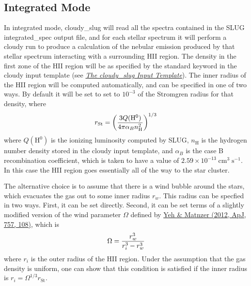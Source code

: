 \documentclass[letterpaper,10pt,english]{sphinxmanual}
\begin{document}
\subsection{Integrated Mode}
\label{cloudy:sssec-cloudy-integrated-mode}\label{cloudy:integrated-mode}
In integrated mode, cloudy\_slug will read all the spectra contained in
the SLUG integrated\_spec output file, and for each stellar spectrum it
will perform a cloudy run to produce a calculation of the nebular
emission produced by that stellar spectrum interacting with a
surrounding HII region. The density in the first zone of the HII
region will be as specified by the standard  keyword in the
cloudy input template (see {\hyperref[cloudy:ssec\string-cloudy\string-template]{\emph{The cloudy\_slug Input Template}}}). The inner
radius of the HII region will be computed automatically, and can be
specified in one of two ways. By default it will be set to
set to \(10^{-3}\) of the Stromgren radius for that density, where
\begin{gather}
\begin{split}r_{\mathrm{St}} = \left(\frac{3 Q(\mathrm{H}^0)}{4\pi
\alpha_B n_{\mathrm{H}}^2}\right)^{1/3}\end{split}\notag
\end{gather}
where \(Q(\mathrm{H}^0)\) is the ionizing luminosity computed by
SLUG, \(n_{\mathrm{H}}\) is the hydrogen number density stored in
the cloudy input template, and \(\alpha_B\) is the case B
recombination coefficient, which is taken to have a value of
\(2.59\times 10^{-13}\;\mathrm{cm}^3\;\mathrm{s}^{-1}\). In this
case the HII region goes essentially all of the way to the star
cluster.

The alternative choice is to assume that there is a wind bubble around
the stars, which evacuates the gas out to some inner radius
\(r_w\). This radius can be specfied in two ways. First, it can be set
directly. Second, it can be set terms of a slightly modified version
of the wind parameter \(\Omega\) defined by \href{http://adsabs.harvard.edu/abs/2012ApJ...757..108Y}{Yeh \& Matnzer (2012,
ApJ, 757, 108)}, which is
\begin{gather}
\begin{split}\Omega = \frac{r_w^3}{r_i^3 - r_w^3}\end{split}\notag
\end{gather}
where \(r_i\) is the outer radius of the HII region. Under the
assumption that the gas density is uniform, one can show that this
condition is satisfied if the inner radius is
\(r_i = \Omega^{1/3} r_{\mathrm{St}}\).
\end{document}
